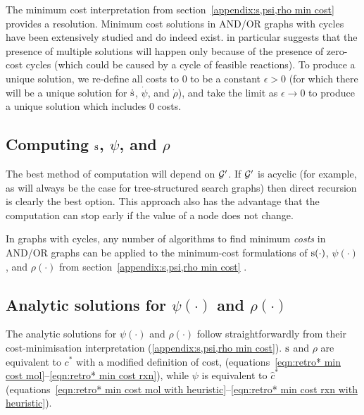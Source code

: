 The minimum cost interpretation from section~\ref{appendix:s,psi,rho min cost}
provides a resolution.
Minimum cost solutions in AND/OR graphs
with cycles have been extensively
studied
\citep{hvalica1996andorsearch,jimenez2000efficient}
and do indeed exist.
\citet[Lemma 1]{hvalica1996andorsearch} in particular suggests
that the presence of multiple solutions will happen only
because of the presence of zero-cost cycles
(which could be caused by a cycle of feasible reactions).
To produce a unique solution,
we re-define all costs to 0 to be a constant $\epsilon>0$
(for which there will be a unique solution for $\dot{{\textnormal{s}}}$, $\dot\psi$, and $\dot\rho$),
and take the limit as $\epsilon\to0$ to produce a unique solution which includes 0 costs.

\subsection{
    Computing
    \texorpdfstring{${\textnormal{s}}$, $\psi$, and $\rho$}{s, ψ and ρ}
}

The best method of computation will depend on ${\mathcal{G}}'$.
If ${\mathcal{G}}'$ is acyclic (for example, as will always be the case for tree-structured search graphs)
then direct recursion is clearly the best option.
This approach also has the advantage that the computation can stop early if
the value of a node does not change.

In graphs with cycles, any number of algorithms to find minimum
\emph{costs} in AND/OR graphs
can be applied to the minimum-cost formulations
of ${\textnormal{s}}(\cdot)$, $\psi(\cdot)$, and $\rho(\cdot)$
from section~\ref{appendix:s,psi,rho min cost}
\citep{chakrabarti1994algorithms,hvalica1996andorsearch,jimenez2000efficient}.

\subsection{Analytic solutions for \texorpdfstring{$\psi(\cdot)$ and $\rho(\cdot)$}{ψ and ρ}}

The analytic solutions for $\psi(\cdot)$ and $\rho(\cdot)$
follow straightforwardly from their cost-minimisation interpretation (\ref{appendix:s,psi,rho min cost}).
${\textnormal{s}}$ and $\rho$ are equivalent to $c^*$ with a modified definition of cost,
(equations~\ref{eqn:retro* min cost mol}--\ref{eqn:retro* min cost rxn}),
while $\psi$ is equivalent to $\hat c^*$
(equations~\ref{eqn:retro* min cost mol with heuristic}--\ref{eqn:retro* min cost rxn with heuristic}).
